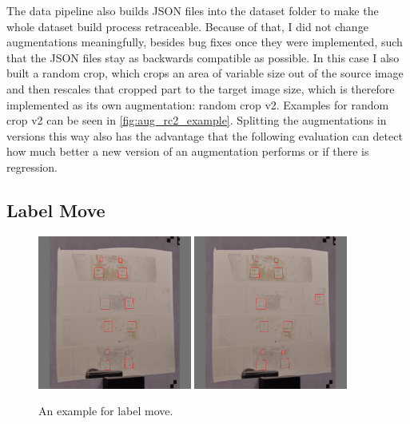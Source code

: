 \documentclass[10pt]{book}
\newcommand{\figureref}[1]{\autoref{#1}}
\begin{document}
The data pipeline also builds \ac{JSON} files into the dataset folder to make the whole dataset build process retraceable. Because of that, I did not change augmentations meaningfully, besides bug fixes once they were implemented, such that the \ac{JSON} files stay as backwards compatible as possible. In this case I also built a random crop, which crops an area of variable size out of the source image and then rescales that cropped part to the target image size, which is therefore implemented as its own augmentation: random crop v2. Examples for random crop v2 can be seen in \figureref{fig:aug_rc2_example}. Splitting the augmentations in versions this way also has the advantage that the following evaluation can detect how much better a new version of an augmentation performs or if there is regression.

\subsection{Label Move}

\begin{figure}
  \centering
     {\includegraphics[width=0.45\textwidth]{image/aug_lm_before}}
     {\includegraphics[width=0.45\textwidth]{image/aug_lm_after}}
  \caption{An example for label move.}
  \label{fig:aug_lm_example}
\end{figure}
\end{document}

